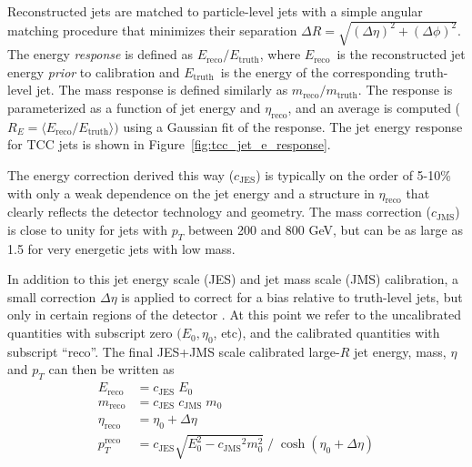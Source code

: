 {
\newcommand{\EReco}{\ensuremath{E_{\mathrm{reco}}}}
\newcommand{\ETruth}{\ensuremath{E_{\mathrm{truth}}}}
\newcommand{\MReco}{\ensuremath{m_{\mathrm{reco}}}}
\newcommand{\MTruth}{\ensuremath{m_{\mathrm{truth}}}}
\newcommand{\CJES}{\ensuremath{c_{\mathrm{JES}}}}
\newcommand{\CJMS}{\ensuremath{c_{\mathrm{JMS}}}}
\newcommand{\EtaReco}{\ensuremath{\eta_{\mathrm{reco}}}}
Reconstructed jets are matched to particle-level jets with a simple angular matching procedure that minimizes their separation $\Delta R = \sqrt{(\Delta \eta)^2 + (\Delta \phi)^2}$.
The energy \textit{response} is defined as $\EReco / \ETruth$, where \EReco\ is the reconstructed jet energy \textit{prior} to calibration and \ETruth\ is the energy of the corresponding truth-level jet.
The mass response is defined similarly as $\MReco / \MTruth$.
The response is parameterized as a function of jet energy and $\eta_{\mathrm{reco}}$, and an average is computed ($R_E = \langle \EReco / \ETruth \rangle)$ using a Gaussian fit of the response. The jet energy response for TCC jets is shown in Figure~\ref{fig:tcc_jet_e_response}.

The energy correction derived this way (\CJES) is typically on the order of 5-10\% with only a weak dependence on the jet energy and a structure in $\eta_{\mathrm{reco}}$ that clearly reflects the detector technology and geometry.
The mass correction (\CJMS) is close to unity for jets with $p_T$ between 200 and 800 GeV, but can be as large as 1.5 for very energetic jets with low mass.

In addition to this jet energy scale (JES) and jet mass scale (JMS) calibration, a small correction $\Delta \eta$ is applied to correct for a bias relative to truth-level jets, but only in certain regions of the detector \cite{TheATLAScollaboration:2015soq}. 
At this point we refer to the uncalibrated quantities with subscript zero $(E_0, \eta_0$, etc), and the calibrated quantities with subscript ``reco''.
The final JES+JMS scale calibrated large-$R$ jet energy, mass, $\eta$ and $p_T$ can then be written as
\begin{align}
    \EReco &= \CJES\; E_0\\
    \MReco &= \CJES\; \CJMS\; m_0\\
    \EtaReco &= \eta_0 + \Delta \eta\\
    p_T^{\mathrm{reco}} &= \CJES \sqrt{E_0^2 - \CJMS^2 m_0^2}\; /\; \cosh{(\eta_0 + \Delta \eta)}
\end{align}
}


